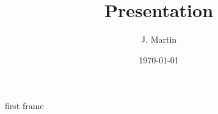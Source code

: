 \documentclass{beamer}
\title{Presentation}
\author{J. Martin}
\date{\today}
\begin{document}
\maketitle

\begin{frame}{first frame}
\end{frame}
\end{document}
